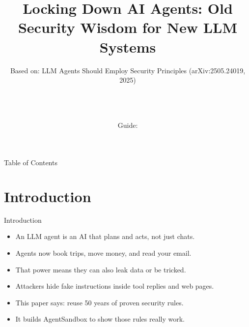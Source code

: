 \documentclass[10pt]{beamer}
\title[B.Tech Seminar]{Locking Down AI Agents: Old Security Wisdom for New LLM Systems}
\subtitle{Based on: LLM Agents Should Employ Security Principles (arXiv:2505.24019, 2025)}
\author[\studentname\ (\shortinst)]{\studentname \\ \small \rollno \\ \small \rollclass \\ \small Guide: \guidename}
\institute[]{\deptname \\ \collegename}
\date{\seminardate}
\begin{document}
\begin{frame}[plain]
  \titlepage
\end{frame}
\begin{frame}{Table of Contents}
  \tableofcontents
\end{frame}
\section{Introduction}
\begin{frame}{Introduction}
\begin{itemize}
  \item An LLM agent is an AI that plans and acts, not just chats.
  \item Agents now book trips, move money, and read your email.
  \item That power means they can also leak data or be tricked.
  \item Attackers hide fake instructions inside tool replies and web pages.
  \item This paper says: reuse 50 years of proven security rules.
  \item It builds AgentSandbox to show those rules really work.
\end{itemize}
\end{frame}
\end{document}
